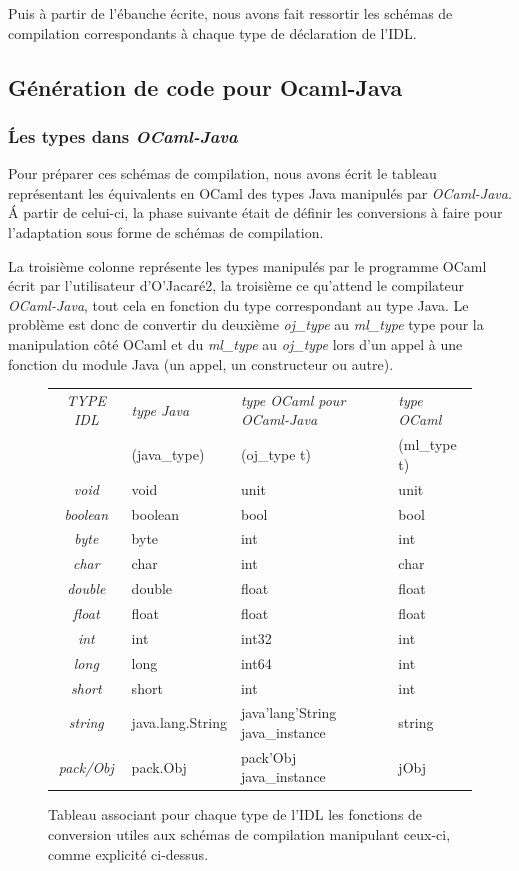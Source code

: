 \documentclass[a4paper, 11pt]{article}
\begin{document}
Puis à partir de l'ébauche écrite, nous avons fait ressortir les schémas de compilation correspondants à chaque type de déclaration de l'IDL.





\subsection{Génération de code pour Ocaml-Java}

\subsubsection{\'Les types dans \emph{OCaml-Java}}
Pour préparer ces schémas de compilation, nous avons écrit le tableau représentant les équivalents en OCaml des types Java manipulés
par \emph{OCaml-Java}. \'A partir de celui-ci, la phase suivante était de définir les conversions à faire pour l'adaptation sous forme de schémas de compilation.

La troisième colonne représente les types manipulés par le programme
OCaml écrit par l'utilisateur d'O'Jacaré2, la troisième ce qu'attend le compilateur \emph{OCaml-Java}, tout cela en fonction du type correspondant au type Java.
Le problème est donc de convertir du deuxième \emph{oj\_type} au \emph{ml\_type} type pour la manipulation côté OCaml et du \emph{ml\_type} au \emph{oj\_type} lors d'un appel à une fonction du module Java (un appel, un constructeur ou autre).

\begin{figure}
\centering
\begin{tabular}{|c|l|l|l|}
 \hline
\emph{TYPE IDL} & \emph{type Java} &\emph{ type OCaml pour OCaml-Java} & \emph{type OCaml} \\
& (java\_type) & (oj\_type t) & (ml\_type t) \\
 \hline
\emph{void} & void & unit & unit\\
\emph{boolean} &boolean & bool & bool\\
\emph{byte} & byte & int & int \\
\emph{char} &char & int & char\\
\emph{double} & double & float & float\\
\emph{float} & float & float & float\\
\emph{int} & int & int32 & int\\
\emph{long} & long & int64 & int\\
\emph{short} & short & int & int\\
\emph{string} & java.lang.String & java'lang'String java\_instance & string\\
\emph{pack/Obj} & pack.Obj & pack'Obj java\_instance & jObj\\
 \hline
\end{tabular}
\caption{Tableau associant pour chaque type de l'IDL les
fonctions de conversion utiles aux schémas de compilation manipulant ceux-ci, comme explicité ci-dessus.}
\end{figure}
\
\newline
\end{document}
